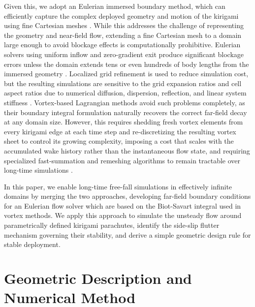 \documentclass[lineno]{JFM-FLM_Au}
\begin{document}
Given this, we adopt an Eulerian immersed boundary method, which can efficiently capture the complex deployed geometry and motion of the kirigami using fine Cartesian meshes \citep{Lauber2022}. While this addresses the challenge of representing the geometry and near-field flow, extending a fine Cartesian mesh to a domain large enough to avoid blockage effects is computationally prohibitive. Eulerian solvers using uniform inflow and zero-gradient exit produce significant blockage errors unless the domain extends tens or even hundreds of body lengths from the immersed geometry \citep{Bose2025PorousIncidence}. Localized grid refinement is used to reduce simulation cost, but the resulting simulations are sensitive to the grid expansion ratios and cell aspect ratios due to numerical diffusion, dispersion, reflection, and linear system stiffness \citep{Colonius2002ADomains}. Vortex-based Lagrangian methods avoid such problems completely, as their boundary integral formulation naturally recovers the correct far-field decay at any domain size. However, this requires shedding fresh vortex elements from every kirigami edge at each time step and re-discretizing the resulting vortex sheet to control its growing complexity, imposing a cost that scales with the accumulated wake history rather than the instantaneous flow state, and requiring specialized fast-summation and remeshing algorithms to remain tractable over long-time simulations \citep{Koumoutsakos1995High-resolutionMethods,Gillis2019AMethod}.

In this paper, we enable long-time free-fall simulations in effectively infinite domains by merging the two approaches, developing far-field boundary conditions for an Eulerian flow solver which are based on the Biot-Savart integral used in vortex methods. We apply this approach to simulate the unsteady flow around parametrically defined kirigami parachutes, identify the side-slip flutter mechanism governing their stability, and derive a simple geometric design rule for stable deployment.

\section{Geometric Description and Numerical Method}\label{sec:method}
\end{document}
